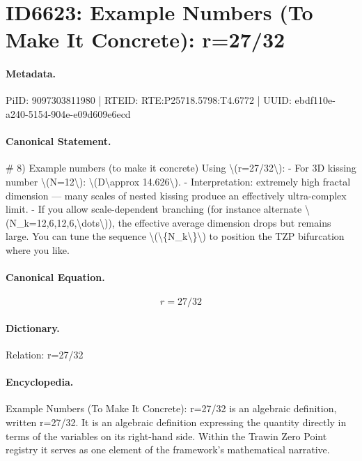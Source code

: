 \section*{ID6623: Example Numbers (To Make It Concrete): r=27/32}
\paragraph{Metadata.}
PiID: 9097303811980 | RTEID: RTE:P25718.5798:T4.6772 | UUID: ebdf110e-a240-5154-904e-e09d609e6ecd

\paragraph{Canonical Statement.}
\# 8) Example numbers (to make it concrete) Using \textbackslash{}(r=27/32\textbackslash{}): - For 3D kissing number \textbackslash{}(N=12\textbackslash{}): \textbackslash{}(D\textbackslash{}approx 14.626\textbackslash{}). - Interpretation: extremely high fractal dimension — many scales of nested kissing produce an effectively ultra-complex limit. - If you allow scale-dependent branching (for instance alternate \textbackslash{}(N\_k=12,6,12,6,\textbackslash{}dots\textbackslash{})), the effective average dimension drops but remains large. You can tune the sequence \textbackslash{}(\textbackslash{}\{N\_k\textbackslash{}\}\textbackslash{}) to position the TZP bifurcation where you like.

\paragraph{Canonical Equation.}
\[
r=27/32
\]

\paragraph{Dictionary.}
Relation: r=27/32

\paragraph{Encyclopedia.}
Example Numbers (To Make It Concrete): r=27/32 is an algebraic definition, written r=27/32. It is an algebraic definition expressing the quantity directly in terms of the variables on its right-hand side. Within the Trawin Zero Point registry it serves as one element of the framework's mathematical narrative.
